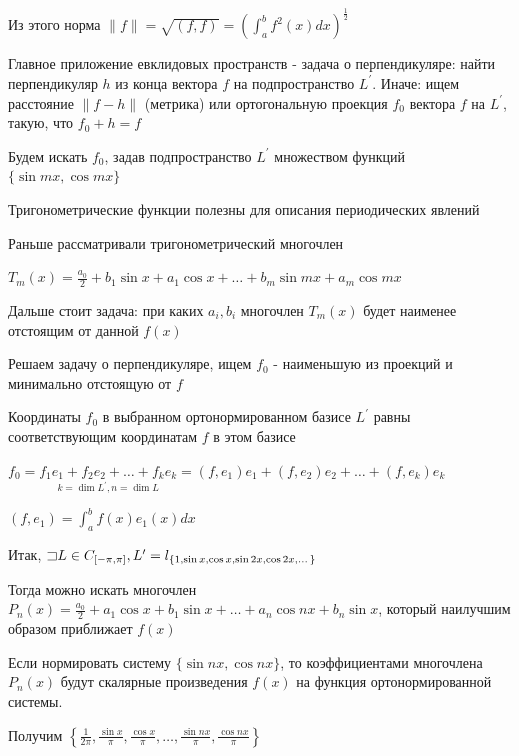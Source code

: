\documentclass[12pt]{article}
\begin{document}
    Из этого норма $\|f\| = \sqrt{(f,f)} = \left(\int_a^b f^2(x) dx\right)^\frac{1}{2}$

    Главное приложение евклидовых пространств - задача о перпендикуляре: найти перпендикуляр $h$ из конца вектора $f$ на подпространство $L^\prime$.
    Иначе: ищем расстояние $\|f - h\|$ (метрика) или ортогональную проекция $f_0$ вектора $f$ на $L^\prime$, такую, что $f_0 + h = f$

    Будем искать $f_0$, задав подпространство $L^\prime$ множеством функций $\{\sin mx, \cos mx\}$

    Тригонометрические функции полезны для описания периодических явлений

    Раньше рассматривали тригонометрический многочлен

    $T_m(x) = \frac{a_0}{2} + b_1 \sin x + a_1 \cos x + \dots + b_m \sin mx + a_m \cos mx$

    Дальше стоит задача: при каких $a_i, b_i$ многочлен $T_m(x)$ будет наименее отстоящим от данной $f(x)$



    \Mem Решаем задачу о перпендикуляре, ищем $f_0$ - наименьшую из проекций и минимально отстоящую от $f$

    Координаты $f_0$ в выбранном ортонормированном базисе $L^\prime$ равны соответствующим координатам $f$ в этом базисе

    $f_0 = \underset{k = \dim L^\prime, n = \dim L}{f_1 e_1 + f_2 e_2 + \dots + f_k e_k} = 
    (f, e_1) e_1 + (f, e_2) e_2 + \dots + (f, e_k) e_k$

    $(f, e_1) = \int_a^b f(x) e_1(x) dx$

    \Nota Итак, $\mathord{\sqsupset} L \in C_{[-\pi, \pi]}, L^\prime = l_{\{1, \sin x, \cos x, \sin 2x, \cos 2x, \dots\}}$

    Тогда можно искать многочлен $P_n(x) = \frac{a_0}{2} + a_1 \cos x + b_1 \sin x + \dots + a_n \cos nx + b_n \sin x$, который
    наилучшим образом приближает $f(x)$

    Если нормировать систему $\{\sin nx, \cos nx\}$, то коэффициентами многочлена $P_n(x)$ будут скалярные произведения
    $f(x)$ на функция ортонормированной системы. 
    
    Получим $\left\{\frac{1}{2\pi}, \frac{\sin x}{\pi}, \frac{\cos x}{\pi}, \dots, \frac{\sin nx}{\pi}, \frac{\cos nx}{\pi}\right\}$
\end{document}

